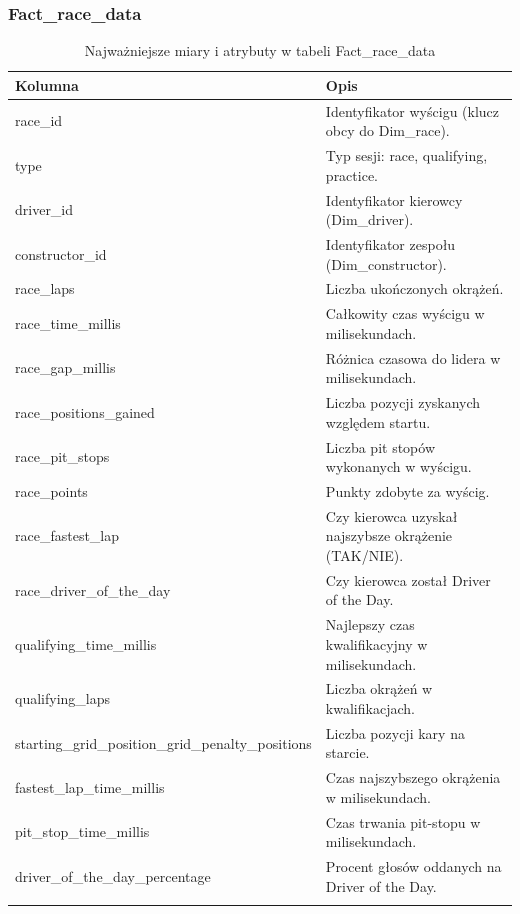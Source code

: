 \documentclass[12pt]{article}
\begin{document}
\subsubsection{Fact\_race\_data}
\begin{longtable}{lp{8.5cm}}
\toprule
\textbf{Kolumna} & \textbf{Opis} \\
\midrule
\endhead

race\_id & Identyfikator wyścigu (klucz obcy do Dim\_race). \\
type & Typ sesji: race, qualifying, practice. \\
driver\_id & Identyfikator kierowcy (Dim\_driver). \\
constructor\_id & Identyfikator zespołu (Dim\_constructor). \\

race\_laps & Liczba ukończonych okrążeń. \\
race\_time\_millis & Całkowity czas wyścigu w milisekundach. \\
race\_gap\_millis & Różnica czasowa do lidera w milisekundach. \\
race\_positions\_gained & Liczba pozycji zyskanych względem startu. \\
race\_pit\_stops & Liczba pit stopów wykonanych w wyścigu. \\
race\_points & Punkty zdobyte za wyścig. \\
race\_fastest\_lap & Czy kierowca uzyskał najszybsze okrążenie (TAK/NIE). \\
race\_driver\_of\_the\_day & Czy kierowca został Driver of the Day. \\

qualifying\_time\_millis & Najlepszy czas kwalifikacyjny w milisekundach. \\
qualifying\_laps & Liczba okrążeń w kwalifikacjach. \\
starting\_grid\_position\_grid\_penalty\_positions & Liczba pozycji kary na starcie. \\

fastest\_lap\_time\_millis & Czas najszybszego okrążenia w milisekundach. \\
pit\_stop\_time\_millis & Czas trwania pit-stopu w milisekundach. \\
driver\_of\_the\_day\_percentage & Procent głosów oddanych na Driver of the Day. \\

\bottomrule
\caption{Najważniejsze miary i atrybuty w tabeli Fact\_race\_data}
\end{longtable}
\end{document}
